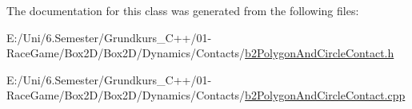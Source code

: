The documentation for this class was generated from the following files\+:\begin{DoxyCompactItemize}
\item 
E\+:/\+Uni/6.\+Semester/\+Grundkurs\+\_\+\+C++/01-\/\+Race\+Game/\+Box2\+D/\+Box2\+D/\+Dynamics/\+Contacts/\mbox{\hyperlink{b2_polygon_and_circle_contact_8h}{b2\+Polygon\+And\+Circle\+Contact.\+h}}\item 
E\+:/\+Uni/6.\+Semester/\+Grundkurs\+\_\+\+C++/01-\/\+Race\+Game/\+Box2\+D/\+Box2\+D/\+Dynamics/\+Contacts/\mbox{\hyperlink{b2_polygon_and_circle_contact_8cpp}{b2\+Polygon\+And\+Circle\+Contact.\+cpp}}\end{DoxyCompactItemize}
